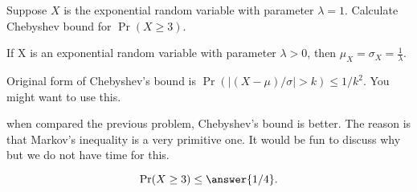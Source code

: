 \documentclass[handout]{ximera}
\begin{document}
\begin{problem}
Suppose $X$ is the exponential random variable with parameter $\lambda=1$. Calculate Chebyshev bound for $\Pr(X\geq 3)$. 
\begin{hint}
\item If X is an exponential random variable with parameter $\lambda>0$, then $\mu_X=\sigma_X=\frac{1}{\lambda}$.
\item Original form of Chebyshev's bound is $\Pr(|(X-\mu)/\sigma|>k)\leq 1/k^2$. You might want to use this. 
\item when compared the previous problem, Chebyshev's bound is better. The reason is that Markov's inequality is a very primitive one. It would be fun to discuss why but we do not have time for this. 
\end{hint}
\begin{prompt}%
$$\Pr(X\geq 3)\leq \answer{1/4}.$$

\end{prompt}
\end{problem}
\end{document}
